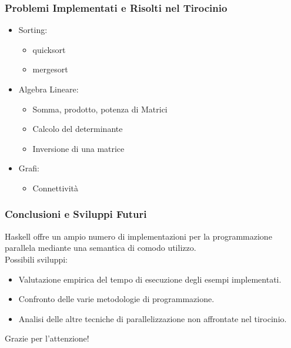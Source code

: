 \documentclass[14pt]{beamer}
\begin{document}

\begin{frame}
\frametitle{Problemi Implementati e Risolti nel Tirocinio}
\begin{itemize}
\item Sorting: 
		\begin{itemize}
			\item quicksort
			\item mergesort
		\end{itemize}
\item Algebra Lineare:
		\begin{itemize}
			\item Somma, prodotto, potenza di Matrici
			\item Calcolo del determinante
			\item Inversione di una matrice
		\end{itemize}
\item Grafi:
		\begin{itemize}
			\item Connettività
		\end{itemize}
\end{itemize}
\end{frame}

\begin{frame}
\frametitle{Conclusioni e Sviluppi Futuri}
Haskell offre un ampio numero di implementazioni per la programmazione parallela mediante una semantica di comodo utilizzo.\\[2pt]
Possibili sviluppi:
\begin{itemize}
\item Valutazione empirica del tempo di esecuzione degli esempi implementati.
\item Confronto delle varie metodologie di programmazione.
\item Analisi delle altre tecniche di parallelizzazione non affrontate
  nel tirocinio.
\end{itemize}
\end{frame}

\begin{frame}
\Huge{\centerline{Grazie per l'attenzione!}}
\end{frame}
\end{document}
